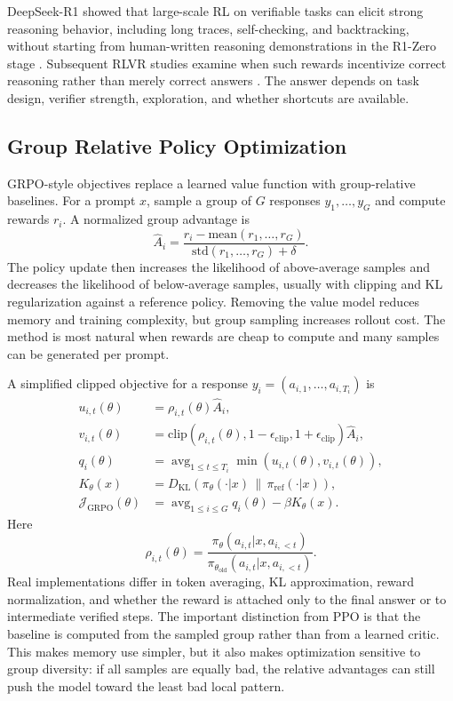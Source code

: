 DeepSeek-R1 showed that large-scale RL on verifiable tasks can elicit strong reasoning behavior, including long traces, self-checking, and backtracking, without starting from human-written reasoning demonstrations in the R1-Zero stage \cite{deepseek2025r1}. Subsequent RLVR studies examine when such rewards incentivize correct reasoning rather than merely correct answers \cite{wen2025rlvr}. The answer depends on task design, verifier strength, exploration, and whether shortcuts are available.

\subsection{Group Relative Policy Optimization}
GRPO-style objectives replace a learned value function with group-relative baselines. For a prompt $x$, sample a group of $G$ responses $y_1,\ldots,y_G$ and compute rewards $r_i$. A normalized group advantage is
\[
    \hat{A}_i
    =
    \frac{r_i-\mathrm{mean}(r_1,\ldots,r_G)}
         {\mathrm{std}(r_1,\ldots,r_G)+\delta}.
\]
The policy update then increases the likelihood of above-average samples and decreases the likelihood of below-average samples, usually with clipping and KL regularization against a reference policy. Removing the value model reduces memory and training complexity, but group sampling increases rollout cost. The method is most natural when rewards are cheap to compute and many samples can be generated per prompt.

A simplified clipped objective for a response $y_i=(a_{i,1},\ldots,a_{i,T_i})$ is
\begin{align*}
    u_{i,t}(\theta)
      &= \rho_{i,t}(\theta)\hat{A}_i,\\
    v_{i,t}(\theta)
      &= \mathrm{clip}(\rho_{i,t}(\theta),1-\epsilon_{\mathrm{clip}},
         1+\epsilon_{\mathrm{clip}})\hat{A}_i,\\
    q_i(\theta)
      &= \operatorname{avg}_{1\le t\le T_i}\min(u_{i,t}(\theta),v_{i,t}(\theta)),\\
    K_\theta(x)
      &= D_{\mathrm{KL}}(\pi_\theta(\cdot|x)\,\|\,\pi_{\mathrm{ref}}(\cdot|x)),\\
    \mathcal{J}_{\mathrm{GRPO}}(\theta)
      &= \operatorname{avg}_{1\le i\le G} q_i(\theta)-\beta K_\theta(x).
\end{align*}
Here
\[
    \rho_{i,t}(\theta)
    =
    \frac{\pi_\theta(a_{i,t}|x,a_{i,<t})}
         {\pi_{\theta_{\mathrm{old}}}(a_{i,t}|x,a_{i,<t})}.
\]
Real implementations differ in token averaging, KL approximation, reward normalization, and whether the reward is attached only to the final answer or to intermediate verified steps. The important distinction from PPO is that the baseline is computed from the sampled group rather than from a learned critic. This makes memory use simpler, but it also makes optimization sensitive to group diversity: if all samples are equally bad, the relative advantages can still push the model toward the least bad local pattern.

